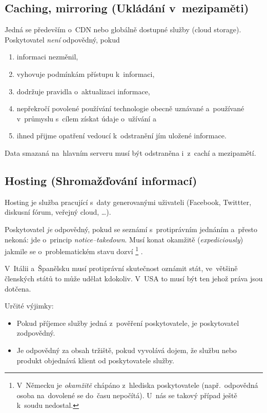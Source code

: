\subsection{Caching, mirroring (Ukládání v~mezipaměti)}

Jedná se především o~CDN nebo globálně dostupné služby (cloud storage).
Poskytovatel \emph{není} odpovědný, pokud
\begin{enumerate}[label=\alph*)]
\item informaci nezměnil,
\item vyhovuje podmínkám přístupu k~informaci,
\item dodržuje pravidla o~aktualizaci informace,
\item nepřekročí povolené používání technologie obecně uznávané a~používané v~průmyslu s~cílem získat údaje o~užívání a
\item ihned přijme opatření vedoucí k~odstranění jím uložené informace.
\end{enumerate}

Data smazaná na~hlavním serveru musí být odstraněna i~z~cachí a mezipamětí.

\subsection{Hosting (Shromažďování informací)}

Hosting je služba pracující s~daty generovanými uživateli (Facebook, Twittter, diskusní fórum, veřejný cloud, \dots).

Poskytovatel \emph{je} odpovědný, pokud se seznámí s~protiprávním jednáním a~přesto nekoná: jde o~princip \emph{notice--takedown}.
Musí konat okamžitě (\emph{expediciously}) jakmile se o~problematickém stavu dozví%
\footnote{
	V~Německu je \emph{okamžitě} chápáno z~hlediska poskytovatele (např.~odpovědná osoba na~dovolené se do~času nepočítá).
	U~nás se takový případ ještě k~soudu nedostal.
}%
.

V~Itálii a~Španělsku musí protiprávní skutečnost oznámit stát, ve~většině členských států to může udělat kdokoliv.
V~USA to musí být ten jehož práva jsou dotčena.

Určité výjimky:
\begin{itemize}
    \item Pokud příjemce služby jedná z~pověření poskytovatele, je poskytovatel zodpovědný.
    \item Je odpovědný za obsah tržiště, pokud vyvolává dojem, že službu nebo produkt objednává klient od poskytovatele služby.
\end{itemize}

